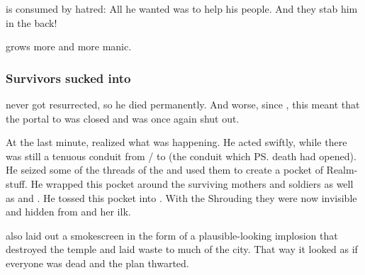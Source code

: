 \Thanatzil{} is consumed by hatred: 
All he wanted was to help his people. 
And they stab him in the back! 


\Thanatzil{} grows more and more manic. 






\subsubsection{Survivors sucked into \Nyx}
\Thanatzil{} never got resurrected, so he died permanently. 
And worse, since , this meant that the portal to \Nyx{} was closed and \Daggerrain{} was once again shut out. 

At the last minute, \Daggerrain{} realized what was happening. 
He acted swiftly, while there was still a tenuous conduit from \Erebos/\Nyx{} to \Tembrae{} (the conduit which \ps{\Thanatzil} death had opened). 
He seized some of the threads of the  and used them to create a pocket of Realm-stuff.
He wrapped this pocket around the surviving mothers and soldiers as well as \Semiza{} and \Eshayzal. 
He tossed this pocket into \Nyx{}. 
With the Shrouding they were now invisible and hidden from \Vexstrasshin{} and her ilk. 

\Daggerrain{} also laid out a smokescreen in the form of a plausible-looking implosion that destroyed the temple and laid waste to much of the city. 
That way it looked as if everyone was dead and the plan thwarted. 






